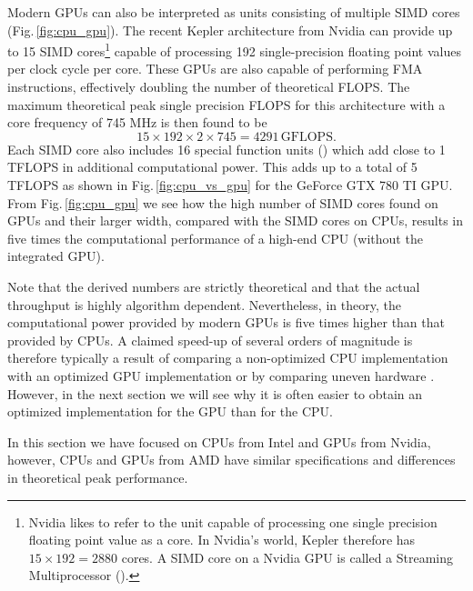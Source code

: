 Modern GPUs can also be interpreted as units consisting of multiple SIMD cores (Fig.\,\ref{fig:cpu_gpu}). The recent Kepler architecture from Nvidia can provide up to 15 SIMD cores\footnote{Nvidia likes to refer to the unit capable of processing one single precision floating point value as a core. In Nvidia's world, Kepler therefore has $15\times192=2880$ cores. A SIMD core on a Nvidia GPU is called a Streaming Multiprocessor ().} capable of processing 192 single-precision floating point values per clock cycle per core. These GPUs are also capable of performing FMA instructions, effectively doubling the number of theoretical FLOPS. The maximum theoretical peak single precision FLOPS for this architecture with a core frequency of 745 MHz is then found to be
\begin{equation}
15 \times 192 \times 2 \times 745 = 4291\,\text{GFLOPS}.
\end{equation} 
Each SIMD core also includes 16 special function units () which add close to 1 TFLOPS in additional computational power. This adds up to a total of 5 TFLOPS as shown in Fig.\,\ref{fig:cpu_vs_gpu} for the GeForce GTX 780 TI GPU. From Fig.\,\ref{fig:cpu_gpu} we see how the high number of SIMD cores found on GPUs and their larger width, compared with the SIMD cores on CPUs, results in five times the computational performance of a high-end CPU (without the integrated GPU). 

Note that the derived numbers are strictly theoretical and that the actual throughput is highly algorithm dependent. Nevertheless, in theory, the computational power provided by modern GPUs is five times higher than that provided by CPUs. A claimed speed-up of several orders of magnitude is therefore typically a result of comparing a non-optimized CPU implementation with an optimized GPU implementation or by comparing uneven hardware \cite{Lee2010, Kothapalli2013}. However, in the next section we will see why it is often easier to obtain an optimized implementation for the GPU than for the CPU.

In this section we have focused on CPUs from Intel and GPUs from Nvidia, however, CPUs and GPUs from AMD have similar specifications and differences in theoretical peak performance. 

